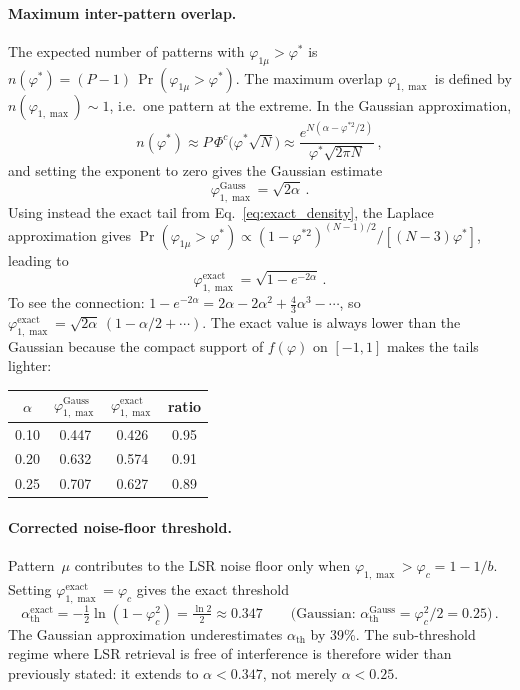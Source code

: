 \documentclass[11pt]{article}
\begin{document}
\paragraph{Maximum inter-pattern overlap.}
The expected number of patterns with $\varphi_{1\mu} > \varphi^*$ is $n(\varphi^*) = (P-1)\,\Pr(\varphi_{1\mu} > \varphi^*)$.  The maximum overlap $\varphi_{1,\max}$ is defined by $n(\varphi_{1,\max}) \sim 1$, i.e.\ one pattern at the extreme.  In the Gaussian approximation,
\[
n(\varphi^*) \approx P\,\Phi^c\!\big(\varphi^*\!\sqrt{N}\big)
\approx \frac{e^{N(\alpha - \varphi^{*2}/2)}}{\varphi^*\sqrt{2\pi N}}\,,
\]
and setting the exponent to zero gives the Gaussian estimate
\begin{equation}
\varphi_{1,\max}^{\mathrm{Gauss}} = \sqrt{2\alpha}\,.
\label{eq:phimax_gauss}
\end{equation}
Using instead the exact tail from Eq.~\eqref{eq:exact_density}, the Laplace approximation gives $\Pr(\varphi_{1\mu} > \varphi^*) \propto (1-\varphi^{*2})^{(N-1)/2}/[(N\!-\!3)\varphi^*]$, leading to
\begin{equation}
\varphi_{1,\max}^{\mathrm{exact}} = \sqrt{1 - e^{-2\alpha}}\,.
\label{eq:phimax_exact}
\end{equation}
To see the connection: $1 - e^{-2\alpha} = 2\alpha - 2\alpha^2 + \tfrac{4}{3}\alpha^3 - \cdots$, so $\varphi_{1,\max}^{\mathrm{exact}} = \sqrt{2\alpha}\,(1 - \alpha/2 + \cdots)$.  The exact value is always lower than the Gaussian because the compact support of $f(\varphi)$ on $[-1,1]$ makes the tails lighter:

\begin{center}
\begin{tabular}{cccc}
\toprule
$\alpha$ & $\varphi_{1,\max}^{\mathrm{Gauss}}$ & $\varphi_{1,\max}^{\mathrm{exact}}$ & ratio \\
\midrule
0.10 & 0.447 & 0.426 & 0.95 \\
0.20 & 0.632 & 0.574 & 0.91 \\
0.25 & 0.707 & 0.627 & 0.89 \\
\bottomrule
\end{tabular}
\end{center}

\paragraph{Corrected noise-floor threshold.}
Pattern~$\mu$ contributes to the LSR noise floor only when $\varphi_{1,\max} > \varphi_c = 1 - 1/b$.  Setting $\varphi_{1,\max}^{\mathrm{exact}} = \varphi_c$ gives the exact threshold
\begin{equation}
\alpha_{\mathrm{th}}^{\mathrm{exact}} = -\tfrac{1}{2}\ln(1-\varphi_c^2) = \tfrac{\ln 2}{2} \approx 0.347
\qquad\bigl(\text{Gaussian: } \alpha_{\mathrm{th}}^{\mathrm{Gauss}} = \varphi_c^2/2 = 0.25\bigr)\,.
\label{eq:alpha_th_exact}
\end{equation}
The Gaussian approximation underestimates $\alpha_{\mathrm{th}}$ by 39\%.  The sub-threshold regime where LSR retrieval is free of interference is therefore wider than previously stated: it extends to $\alpha < 0.347$, not merely $\alpha < 0.25$.
\end{document}
